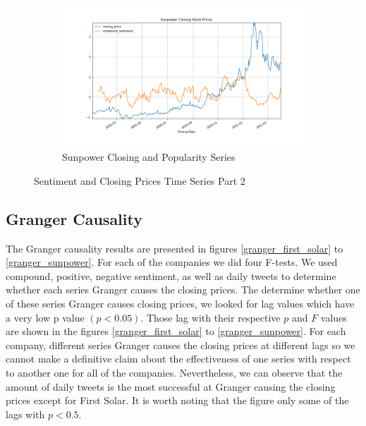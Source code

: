 \documentclass[sigconf, nonacm]{acmart}
\begin{document}
\begin{figure}[H]
\centering
   \begin{subfigure}[b]{0.5\textwidth}
   \includegraphics[width=\textwidth]{sentiment_time_series/Sunpower Closing Stock Prices_closing_price_compound_sentiment.png} 
   \caption{Sunpower Closing and Popularity Series}
   \label{fig:Ng1} 
\end{subfigure}
\caption{Sentiment and Closing Prices Time Series Part 2}
\end{figure}



\subsection{Granger Causality} 
The Granger causality results are presented in figures \ref{granger_first_solar} to \ref{granger_sunpower}. For each of the companies we did four F-tests. We used compound, positive, negative sentiment, as well as daily tweets to determine whether each series Granger causes the closing prices. The determine whether one of these series Granger causes closing prices, we looked for lag values which have a very low p value $(p < 0.05)$. Those lag with their respective $p$ and $F$ values are shown in the figures  \ref{granger_first_solar} to \ref{granger_sunpower}. \newline
For each company, different series Granger causes the closing prices at different lags so we cannot make a definitive claim about the effectiveness of one series with respect to another one for all of the companies. Nevertheless, we can observe that the amount of daily tweets is the most successful at Granger causing the closing prices except for First Solar.  It is worth noting that the figure only some of the lags with $p < 0.5$.
\end{document}
